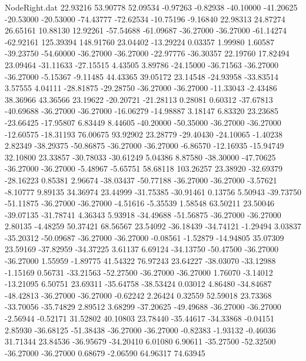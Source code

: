 \begin{filecontents}{NodeRight.dat}
  22.93216   53.90778   52.09534    -0.97263   -0.82938  -40.10000  -41.20625  -20.53000  -20.53000  -74.43777  -72.62534  -10.75196   -9.16840
  22.98313   24.87274   26.65161    10.88130   12.92261  -57.54688  -61.09687  -36.27000  -36.27000  -61.14274  -62.92161  125.39394  148.91760
  23.04402  -13.29224    0.03357     1.99980    1.60587  -39.23750  -54.60000  -36.27000  -36.27000  -22.97776  -36.30357   22.19760   17.82494
  23.09464  -31.11633  -27.15515     4.43505    3.89786  -24.15000  -36.71563  -36.27000  -36.27000   -5.15367   -9.11485   44.43365   39.05172
  23.14548  -24.93958  -33.83514     3.57555    4.04111  -28.81875  -29.28750  -36.27000  -36.27000  -11.33043   -2.43486   38.36966   43.36566
  23.19622  -20.20721  -21.28113     0.28081    0.60312  -37.67813  -40.69688  -36.27000  -36.27000  -16.06279  -14.98887    3.18147    6.83320
  23.23685  -23.66425  -17.95807     6.83449    8.44605  -40.20000  -50.35000  -36.27000  -36.27000  -12.60575  -18.31193   76.00675   93.92902
  23.28779  -29.40430  -24.10065    -1.40238    2.82349  -38.29375  -50.86875  -36.27000  -36.27000   -6.86570  -12.16935  -15.94749   32.10800
  23.33857  -30.78033  -30.61249     5.04386    8.87580  -38.30000  -47.70625  -36.27000  -36.27000   -5.48967   -5.65751   58.68118  103.26257
  23.38920  -32.69379  -28.16223     0.85381    2.96674  -38.03437  -50.77188  -36.27000  -36.27000   -3.57621   -8.10777    9.89135   34.36974
  23.44999  -31.75385  -30.91461     0.13756    5.50943  -39.73750  -51.11875  -36.27000  -36.27000   -4.51616   -5.35539    1.58548   63.50211
  23.50046  -39.07135  -31.78741     4.36343    5.93918  -34.49688  -51.56875  -36.27000  -36.27000    2.80135   -4.48259   50.37421   68.56567
  23.54092  -36.18439  -34.74121    -1.29494    3.03837  -35.20312  -50.09687  -36.27000  -36.27000   -0.08561   -1.52879  -14.94805   35.07309
  23.59169  -37.82959  -34.37225     3.61137    6.69124  -34.13750  -50.47500  -36.27000  -36.27000    1.55959   -1.89775   41.54322   76.97243
  23.64227  -38.03070  -33.12988    -1.15169    0.56731  -33.21563  -52.27500  -36.27000  -36.27000    1.76070   -3.14012  -13.21095    6.50751
  23.69311  -35.64758  -38.53424     0.03012    4.86480  -34.84687  -48.42813  -36.27000  -36.27000   -0.62242    2.26424    0.32559   52.59018
  23.73368  -33.70056  -35.74829     2.89512    3.68299  -37.20625  -49.49688  -36.27000  -36.27000   -2.56944   -0.52171   31.52802   40.10803
  23.78440  -35.44617  -34.33868    -0.04151    2.85930  -36.68125  -51.38438  -36.27000  -36.27000   -0.82383   -1.93132   -0.46036   31.71344
  23.84536  -36.95679  -34.20410     6.01080    6.90611  -35.27500  -52.32500  -36.27000  -36.27000    0.68679   -2.06590   64.96317   74.63945

\end{filecontents}
